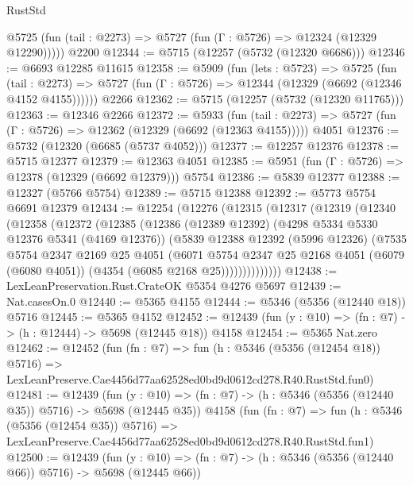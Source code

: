 \begin{lexlean}{RustStd}
\begin{coremodule}
      @5725 (fun (tail : @2273) => @5727 (fun (Γ : @5726) => @12324 (@12329 @12290)))))
    @2200
@12344 := @5715 (@12257 (@5732 (@12320 @6686)))
@12346 := @6693 @12285 @11615
@12358 := @5909
    (fun (lets : @5723) =>
    @5725
      (fun (tail : @2273) =>
      @5727 (fun (Γ : @5726) => @12344 (@12329 (@6692 (@12346 @4152 @4155))))))
    @2266
@12362 := @5715 (@12257 (@5732 (@12320 @11765)))
@12363 := @12346 @2266
@12372 := @5933
    (fun (tail : @2273) => @5727 (fun (Γ : @5726) => @12362 (@12329 (@6692 (@12363 @4155)))))
    @4051
@12376 := @5732 (@12320 (@6685 (@5737 @4052)))
@12377 := @12257 @12376
@12378 := @5715 @12377
@12379 := @12363 @4051
@12385 := @5951 (fun (Γ : @5726) => @12378 (@12329 (@6692 @12379))) @5754
@12386 := @5839 @12377
@12388 := @12327 (@5766 @5754)
@12389 := @5715 @12388
@12392 := @5773 @5754 @6691 @12379
@12434 := @12254
    (@12276
      (@12315
        (@12317
          (@12319
            (@12340
              (@12358
                (@12372
                  (@12385
                    (@12386
                      (@12389 @12392)
                      (@4298 @5334 @5330 @12376 @5341 (@4169 @12376))
                      (@5839
                        @12388
                        @12392
                        (@5996 @12326)
                        (@7535
                          @5754
                          @2347
                          @2169
                          @25
                          @4051
                          (@6071
                            @5754
                            @2347
                            @25
                            @2168
                            @4051
                            (@6079 (@6080 @4051))
                            (@4354 (@6085 @2168 @25))))))))))))))
@12438 := LexLeanPreservation.Rust.CrateOK @5354 @4276 @5697
@12439 := Nat.casesOn.{0}
@12440 := @5365 @4155
@12444 := @5346 (@5356 (@12440 @18)) @5716
@12445 := @5365 @4152
@12452 := @12439 (fun (y : @10) => (fn : @7) -> (h : @12444) -> @5698 (@12445 @18)) @4158
@12454 := @5365 Nat.zero
@12462 := @12452
    (fun (fn : @7) =>
    fun (h : @5346 (@5356 (@12454 @18)) @5716) =>
    LexLeanPreserve.Cae4456d77aa62528ed0bd9d0612cd278.R40.RustStd.fun0)
@12481 := @12439
    (fun (y : @10) => (fn : @7) -> (h : @5346 (@5356 (@12440 @35)) @5716) -> @5698 (@12445 @35))
    @4158
    (fun (fn : @7) =>
    fun (h : @5346 (@5356 (@12454 @35)) @5716) =>
    LexLeanPreserve.Cae4456d77aa62528ed0bd9d0612cd278.R40.RustStd.fun1)
@12500 := @12439
    (fun (y : @10) => (fn : @7) -> (h : @5346 (@5356 (@12440 @66)) @5716) -> @5698 (@12445 @66))

\end{coremodule}
\end{lexlean}
